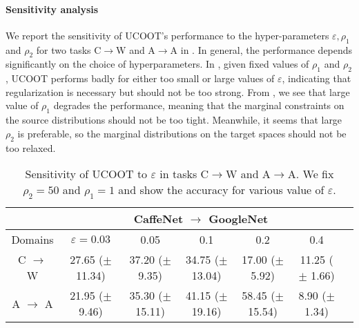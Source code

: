 \paragraph{Sensitivity analysis}
We report the sensitivity of UCOOT's performance to the hyper-parameters $\varepsilon, \rho_1$
and $\rho_2$ for two tasks C$\to$W and A$\to$A in
. In general,
the performance depends significantly on the choice of hyperparameters.
In , given fixed values of $\rho_1$ and $\rho_2$,
UCOOT performs badly for either too small or large values of $\varepsilon$,
indicating that regularization is necessary but should not be too strong.
From , we see that large value of $\rho_1$ degrades
the performance, meaning that the marginal constraints on the source distributions should not
be too tight. Meanwhile, it seems that large $\rho_2$ is preferable,
so the marginal distributions on the target spaces should not be too relaxed.

\hfill
\begin{table}[H]
	\begin{center}
		\begin{footnotesize}
			\begin{sc}
				\begin{tabular}{c c c c c c c}
					\toprule
					& \multicolumn{5}{c}{CaffeNet $\to$ GoogleNet} \\
					\midrule
					Domains & $\varepsilon= 0.03$ & 0.05 & 0.1 & 0.2 & 0.4 \\
					\midrule
					C $\to$ W & 27.65 ($\pm$ 11.34) & 37.20 ($\pm$ 9.35) & 34.75 ($\pm$ 13.04) & 17.00 ($\pm$ 5.92) & 11.25 ($\pm$ 1.66) \\
					\hline
					A $\to$ A & 21.95 ($\pm$ 9.46) & 35.30 ($\pm$ 15.11) & 41.15 ($\pm$ 19.16) & 58.45 ($\pm$ 15.54) & 8.90 ($\pm$ 1.34) \\
					\hline
				\end{tabular}
			\end{sc}
		\end{footnotesize}
	\end{center}
	\caption{Sensitivity of UCOOT to $\varepsilon$ in tasks C$\to$W and A$\to$A.
  We fix $\rho_2 = 50$ and $\rho_1 = 1$ and show the accuracy for various value of
  $\varepsilon$.} \label{tab:sensitiv_eps}
\end{table}

